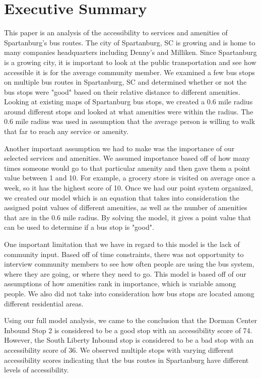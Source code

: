 \section*{Executive Summary}

This paper is an analysis of the accessibility to services and amenities of Spartanburg's bus routes.  The city of Spartanburg, SC is growing and is home to many companies headquarters including Denny's and Milliken.  Since Spartanburg is a growing city, it is important to look at the public transportation and see how accessible it is for the average community member.  We examined a few bus stops on multiple bus routes in Spartanburg, SC and determined whether or not the bus stops were "good" based on their relative distance to different amenities.  Looking at existing maps of Spartanburg bus stops, we created a 0.6 mile radius around different stops and looked at what amenities were within the radius.  The 0.6 mile radius was used in assumption that the average person is willing to walk that far to reach any service or amenity.  

Another important assumption we had to make was the importance of our selected services and amenities.  We assumed importance based off of how many times someone would go to that particular amenity and then gave them a point value between 1 and 10.  For example, a grocery store is visited on average once a week, so it has the highest score of 10.  Once we had our point system organized, we created our model which is an equation that takes into consideration the assigned point values of different amenities, as well as the number of amenities that are in the 0.6 mile radius.  By solving the model, it gives a point value that can be used to determine if a bus stop is "good". 

One important limitation that we have in regard to this model is the lack of community input.  Based off of time constraints, there was not opportunity to interview community members to see how often people are using the bus system, where they are going, or where they need  to go. This model is based off of our assumptions of how amenities rank in importance, which is variable among people.  We also did not take into consideration how bus stops are located among different residential areas.

Using our full model analysis, we came to the conclusion that the Dorman Center Inbound Stop 2 is considered to be a good stop with an accessibility score of 74.  However, the South Liberty Inbound stop is considered to be a bad stop with an accessibility score of 36.  We observed multiple stops with varying different accessibility scores indicating that the bus routes in Spartanburg have different levels of accessibility.